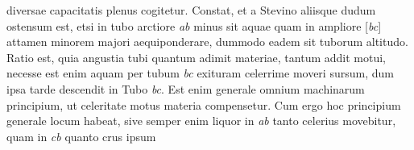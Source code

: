                     diversae capacitatis   plenus cogitetur. Constat,    
                   et a Stevino\protect{} aliisque dudum ostensum est, etsi in tubo arctiore \textit{ab} minus sit aquae quam in ampliore [\textit{bc}] attamen minorem majori aequiponderare, dummodo eadem sit tuborum altitudo. Ratio est, quia angustia tubi quantum adimit materiae, tantum addit motui, necesse est enim aquam per tubum \textit{bc} exituram celerrime moveri sursum, dum ipsa tarde descendit in Tubo \textit{bc}. Est enim generale omnium machinarum principium, ut celeritate motus materia compensetur. Cum ergo hoc principium generale locum habeat, sive  semper enim liquor\protect{} in \textit{ab} tanto celerius movebitur, quam in \textit{cb} quanto crus ipsum 